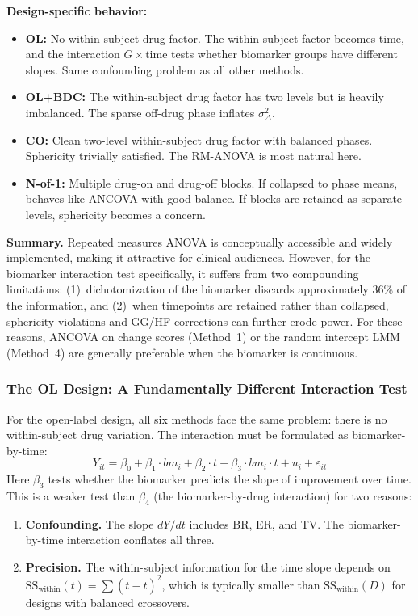 \documentclass[11pt]{article}
\begin{document}
\textbf{Design-specific behavior:}
\begin{itemize}[nosep]
\item \textbf{OL:} No within-subject drug factor. The within-subject
  factor becomes time, and the interaction $G \times \text{time}$ tests
  whether biomarker groups have different slopes. Same confounding
  problem as all other methods.
\item \textbf{OL+BDC:} The within-subject drug factor has two levels
  but is heavily imbalanced. The sparse off-drug phase inflates
  $\sigma^2_\Delta$.
\item \textbf{CO:} Clean two-level within-subject drug factor with
  balanced phases. Sphericity trivially satisfied. The RM-ANOVA is most
  natural here.
\item \textbf{N-of-1:} Multiple drug-on and drug-off blocks. If
  collapsed to phase means, behaves like ANCOVA with good balance. If
  blocks are retained as separate levels, sphericity becomes a concern.
\end{itemize}

\textbf{Summary.} Repeated measures ANOVA is conceptually accessible and
widely implemented, making it attractive for clinical audiences. However,
for the biomarker interaction test specifically, it suffers from two
compounding limitations: (1)~dichotomization of the biomarker discards
approximately 36\% of the information, and (2)~when timepoints are
retained rather than collapsed, sphericity violations and GG/HF
corrections can further erode power. For these reasons, ANCOVA on change
scores (Method~1) or the random intercept LMM (Method~4) are generally
preferable when the biomarker is continuous.

\subsubsection{The OL Design: A Fundamentally Different Interaction Test}

For the open-label design, all six methods face the same problem: there
is no within-subject drug variation. The interaction must be formulated
as biomarker-by-time:
\[
Y_{it} = \beta_0 + \beta_1 \cdot bm_i + \beta_2 \cdot t
+ \beta_3 \cdot bm_i \cdot t + u_i + \varepsilon_{it}
\]
Here $\beta_3$ tests whether the biomarker predicts the slope of
improvement over time. This is a weaker test than $\beta_4$ (the
biomarker-by-drug interaction) for two reasons:
\begin{enumerate}[nosep]
\item \textbf{Confounding.} The slope $dY/dt$ includes BR, ER, and TV.
  The biomarker-by-time interaction conflates all three.
\item \textbf{Precision.} The within-subject information for the time
  slope depends on
  $\text{SS}_{\text{within}}(t) = \sum(t - \bar{t})^2$, which is
  typically smaller than $\text{SS}_{\text{within}}(D)$ for designs
  with balanced crossovers.
\end{enumerate}
\end{document}
